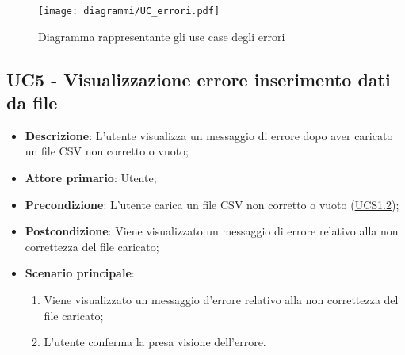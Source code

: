 \begin{figure}[h]
    \centering
    \texttt{[image: diagrammi/UC\_errori.pdf]}
    \caption{Diagramma rappresentante gli use case degli errori}
    \label{fig:UC5}
\end{figure}

\subsection{UC5 - Visualizzazione errore inserimento dati da file}
\label{sub:uc5}
\begin{itemize}
    \item \textbf{Descrizione}: L'utente visualizza un messaggio di errore dopo aver caricato un file CSV non corretto 
    o vuoto;

    \item \textbf{Attore primario}: Utente;
    
    \item \textbf{Precondizione}:   L'utente carica un file CSV non corretto o vuoto (\hyperref[ssub:ucs1.2]{UCS1.2});

    \item \textbf{Postcondizione}:  Viene visualizzato un messaggio di errore relativo alla non correttezza del file 
    caricato;

    \item \textbf{Scenario principale}:
    \begin{enumerate}
        \item Viene visualizzato un messaggio d'errore relativo alla non correttezza del file caricato;
        \item L'utente conferma la presa visione dell'errore.
    \end{enumerate}

\end{itemize}